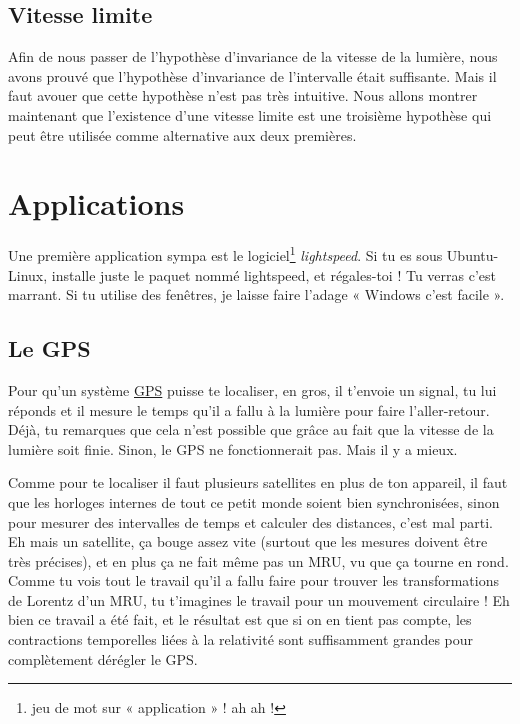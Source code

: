 \subsection{Vitesse limite}

Afin de nous passer de l'hypothèse d'invariance de la vitesse de la lumière, nous avons prouvé que l'hypothèse d'invariance de l'intervalle était suffisante. Mais il faut avouer que cette hypothèse n'est pas très intuitive. Nous allons montrer maintenant que l'existence d'une vitesse limite est une troisième hypothèse qui peut être utilisée comme alternative aux deux premières.

\section{Applications}

Une première application sympa est le logiciel\footnote{jeu de mot sur « application » ! ah ah !} \emph{lightspeed}. Si tu es sous Ubuntu-Linux, installe juste le paquet nommé lightspeed, et régales-toi ! Tu verras c'est marrant. Si tu utilise des fenêtres, je laisse faire l'adage « Windows c'est facile ».

\subsection{Le GPS}

Pour qu'un système \href{http://fr.wikipedia.org/wiki/Global\_Positioning\_System}{GPS} puisse te localiser, en gros, il t'envoie un signal, tu lui réponds et il mesure le temps qu'il a fallu à la lumière pour faire l'aller-retour. Déjà, tu remarques que cela n'est possible que grâce au fait que la vitesse de la lumière soit finie. Sinon, le GPS ne fonctionnerait pas. Mais il y a mieux.

Comme pour te localiser il faut plusieurs satellites en plus de ton appareil, il faut que les horloges internes de tout ce petit monde soient bien synchronisées, sinon pour mesurer des intervalles de temps et calculer des distances, c'est mal parti. Eh mais un satellite, ça bouge assez vite (surtout que les mesures doivent être très précises), et en plus ça ne fait même pas un MRU, vu que ça tourne en rond. Comme tu vois tout le travail qu'il a fallu faire pour trouver les transformations de Lorentz d'un MRU, tu t'imagines le travail pour un mouvement circulaire ! Eh bien ce travail a été fait, et le résultat est que si on en tient pas compte, les contractions temporelles liées à la relativité sont suffisamment grandes pour complètement dérégler le GPS.


